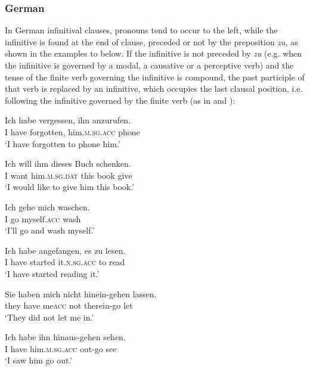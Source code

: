 \documentclass[output=paper,modfonts,nonflat,newtxmath]{langsci/langscibook}
\begin{document}
\subsubsection{German}%

In German infinitival clauses, pronouns tend to occur to the left, while the infinitive is found at the end of clause, preceded or not by the preposition \textit{zu}, as shown in the examples  to  below. If the infinitive is not preceded by \textit{zu} (e.g. when the infinitive is governed by a modal, a causative or a perceptive verb) and the tense of the finite verb governing the infinitive is compound, the past participle of that verb is replaced by an infinitive, which occupies the last clausal position, i.e. following the infinitive governed by the finite verb (as in  and ):

\ea \label{ex:sciutti:10}
    \gll Ich habe vergessen, ihn anzurufen.\\
        I have forgotten, him.\textsc{m.sg.acc}  phone\\
    \glt  ‘I have forgotten to phone him.’
\z

\ea \label{ex:sciutti:11}
    \gll Ich  will ihm dieses Buch schenken.\\
        I want him.\textsc{m.sg.dat} this  book  give \\
    \glt  ‘I would like to give him this book.’
\z

\ea \label{ex:sciutti:12}
    \gll Ich gehe mich waschen.\\
        I go myself.\textsc{acc} wash \\
    \glt  ‘I’ll go and wash myself.’
\z

\ea \label{ex:sciutti:13}
    \gll Ich habe angefangen, es zu lesen.\\
        I have started it.\textsc{n.sg.acc} to read \\
    \glt  ‘I have started reading it.’
\z


\ea \label{ex:sciutti:14}
    \gll Sie haben mich nicht hinein-gehen lassen.\\
         they have me\textsc{acc}   not   therein-go let\\
    \glt  ‘They did not let me in.’
\z

\ea \label{ex:sciutti:15}
    \gll Ich habe ihn hinaus-gehen sehen.\\
         I have him.\textsc{m.sg.acc} out-go see\\
    \glt  ‘I saw him go out.’
\z
\end{document}
